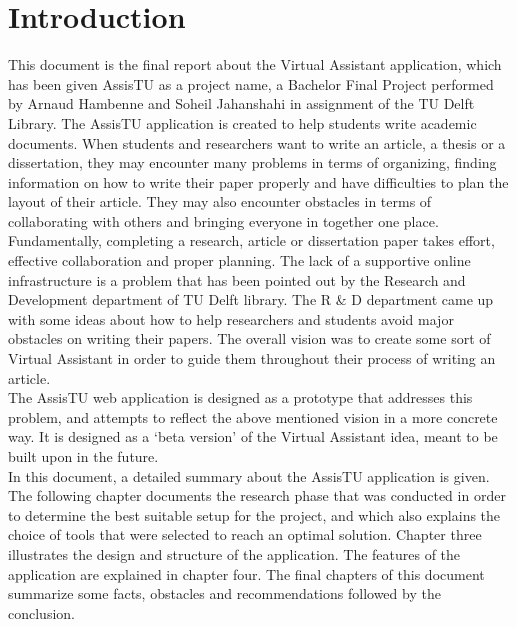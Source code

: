 \chapter{Introduction}

This document is the final report about the Virtual Assistant application, which has been given AssisTU as a project name, a Bachelor Final Project performed by Arnaud Hambenne and Soheil Jahanshahi in assignment of the TU Delft Library. The AssisTU application is created to help students write academic documents. When students and researchers want to write an article, a thesis or a dissertation, they may encounter many problems in terms of organizing, finding information on how to write their paper properly and have difficulties to plan the layout of their article. They may also encounter obstacles in terms of collaborating with others and bringing everyone in together one 
place. \\

Fundamentally, completing a research, article or dissertation paper takes effort, effective collaboration and proper planning. The lack of a supportive online infrastructure is a problem that has been pointed out by the Research and Development department of TU Delft library. The R \& D department came up with some ideas about how to help researchers and students avoid major obstacles on writing their papers. The overall vision was to create some sort of Virtual Assistant in order to guide them throughout their process of writing an article.\\

The AssisTU web application is designed as a prototype that addresses this problem, and attempts to reflect the above mentioned vision in a more concrete way. It is designed as a `beta version' of the Virtual Assistant idea, meant to be built upon in the future.\\ 

In this document, a detailed summary about the AssisTU application is given. The following chapter documents the research phase that was conducted in order to determine the best suitable setup for the project, and which also explains the choice of tools that were selected to reach an optimal solution. 
Chapter three illustrates the design and structure of the application. The features of the application are explained in chapter four. The final chapters of this document summarize some facts, obstacles and recommendations followed by the conclusion.  